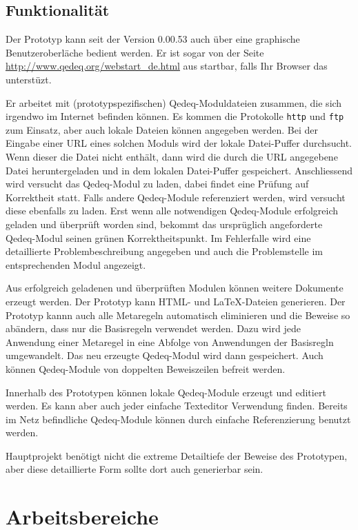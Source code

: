 \documentclass[a4paper,german,10pt,twoside]{book}
\begin{document}
{\section{Funktionalit{\"a}t}
Der Prototyp kann seit der Version 0.00.53 auch {\"u}ber eine graphische Benutzeroberl{\"a}che bedient
werden. Er ist sogar von der Seite \url{http://www.qedeq.org/webstart_de.html} aus startbar, falls
Ihr Browser das unterst{\"u}zt.
\par
Er arbeitet mit (prototypspezifischen) Qedeq-Moduldateien zusammen, die sich irgendwo im Internet
befinden k{\"o}nnen. Es kommen die Protokolle {\tt http} und {\tt ftp} zum Einsatz, aber auch lokale
Dateien k{\"o}nnen angegeben werden. Bei der Eingabe einer URL eines solchen Moduls wird der lokale
Datei-Puffer durchsucht. Wenn dieser die Datei nicht enth{\"a}lt, dann wird die durch die URL
angegebene Datei heruntergeladen und in dem lokalen Datei-Puffer gespeichert. Anschliessend wird
versucht das Qedeq-Modul zu laden, dabei findet eine Pr{\"u}fung auf Korrektheit statt. Falls andere
Qedeq-Module referenziert werden, wird versucht diese ebenfalls zu laden. Erst wenn alle
notwendigen Qedeq-Module erfolgreich geladen und {\"u}berpr{\"u}ft worden sind, bekommt das urspr{\"u}glich
angeforderte Qedeq-Modul seinen {\glqq gr{\"u}nen Korrektheitspunkt\grqq}. Im Fehlerfalle wird eine
detaillierte Problembeschreibung angegeben und auch die Problemstelle im entsprechenden Modul
angezeigt.
\par
Aus erfolgreich geladenen und {\"u}berpr{\"u}ften Modulen k{\"o}nnen weitere Dokumente erzeugt werden. Der
Prototyp kann HTML- und \LaTeX-Dateien generieren. Der Prototyp kannn auch alle Metaregeln
automatisch eliminieren und die Beweise so ab{\"a}ndern, dass nur die Basisregeln verwendet werden.
Dazu wird jede Anwendung einer Metaregel in eine Abfolge von Anwendungen der Basisregln
umgewandelt. Das neu erzeugte Qedeq-Modul wird dann gespeichert. Auch k{\"o}nnen Qedeq-Module von
doppelten Beweiszeilen befreit werden.
\par
Innerhalb des Prototypen k{\"o}nnen lokale Qedeq-Module erzeugt und editiert werden. Es kann aber auch
jeder einfache Texteditor Verwendung finden. Bereits im Netz befindliche Qedeq-Module k{\"o}nnen durch
einfache Referenzierung benutzt werden.
\par
Hauptprojekt ben{\"o}tigt nicht die extreme Detailtiefe der Beweise des Prototypen, aber diese
detaillierte Form sollte dort auch generierbar sein.


\chapter{Arbeitsbereiche} \label{Arbeitsbereiche}

}
\end{document}

